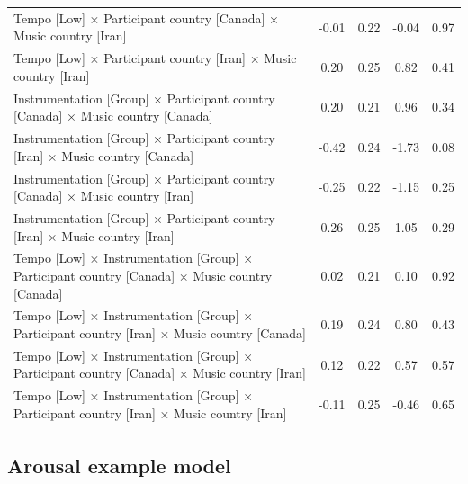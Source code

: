 \documentclass[
  bookmarksnumbered]{article}
\begin{document}
\begin{table}[H]
{\begin{tabular}[t]{lcccc}
\hspace{1em}Tempo [Low] × Participant country [Canada] × Music country [Iran] & -0.01 & 0.22 & -0.04 & 0.97\\
\hspace{1em}Tempo [Low] × Participant country [Iran] × Music country [Iran] & 0.20 & 0.25 & 0.82 & 0.41\\
\hspace{1em}Instrumentation [Group] × Participant country [Canada] × Music country [Canada] & 0.20 & 0.21 & 0.96 & 0.34\\
\hspace{1em}Instrumentation [Group] × Participant country [Iran] × Music country [Canada] & -0.42 & 0.24 & -1.73 & 0.08\\
\hspace{1em}Instrumentation [Group] × Participant country [Canada] × Music country [Iran] & -0.25 & 0.22 & -1.15 & 0.25\\
\hspace{1em}Instrumentation [Group] × Participant country [Iran] × Music country [Iran] & 0.26 & 0.25 & 1.05 & 0.29\\
\hspace{1em}Tempo [Low] × Instrumentation [Group] × Participant country [Canada] × Music country [Canada] & 0.02 & 0.21 & 0.10 & 0.92\\
\hspace{1em}Tempo [Low] × Instrumentation [Group] × Participant country [Iran] × Music country [Canada] & 0.19 & 0.24 & 0.80 & 0.43\\
\hspace{1em}Tempo [Low] × Instrumentation [Group] × Participant country [Canada] × Music country [Iran] & 0.12 & 0.22 & 0.57 & 0.57\\
\hspace{1em}Tempo [Low] × Instrumentation [Group] × Participant country [Iran] × Music country [Iran] & -0.11 & 0.25 & -0.46 & 0.65\\
\bottomrule
\end{tabular}}
\end{table}

\hypertarget{arousal-example-model}{%
\subsection{Arousal example model}\label{arousal-example-model}}
\end{document}
